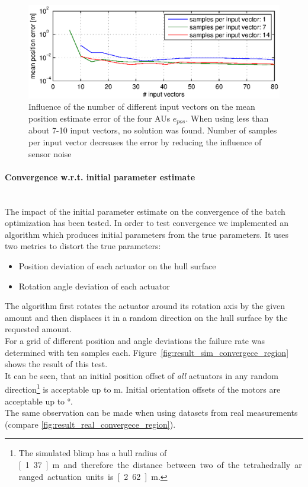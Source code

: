 \begin{figure}[hbtp]
\centering
\includegraphics[width = \textwidth]{images/results/input_length_vs_position_error.eps}
\caption{Influence of the number of different input vectors on the mean position estimate error of the four AUs $e_{pos}$.
When using less than about 7-10 input vectors, no solution was found.
Number of samples per input vector decreases the error by reducing the influence of sensor noise}
\label{fig:result_inputlength}
\end{figure}

\paragraph{Convergence w.r.t. initial parameter estimate} ~\\
The impact of the initial parameter estimate on the convergence of the batch optimization has been tested.
In order to test convergence we implemented an algorithm which produces initial parameters from the true parameters.
It uses two metrics to distort the true parameters:
\begin{itemize}
\item Position deviation of each actuator on the hull surface
\item Rotation angle deviation of each actuator
\end{itemize}
The algorithm first rotates the actuator around its rotation axis by the given amount and then displaces it in a random direction on the hull surface by the requested amount. \\
For a grid of different position and angle deviations the failure rate was determined with ten samples each.
Figure~\ref{fig:result_sim_convergece_region} shows the result of this test.\\
It can be seen, that an initial position offset of \textit{all} actuators in any random direction\footnote{
The simulated blimp has a hull radius of \unit[1.37]{m} and therefore the distance between two of the tetrahedrally arranged actuation units is \unit[2.62]{m}.}
is acceptable up to \unit[1]{m}.
Initial orientation offsets of the motors are acceptable up to \unit[120]{°}.
\\
The same observation can be made when using datasets from real measurements (compare \cref{fig:result_real_convergece_region}).

